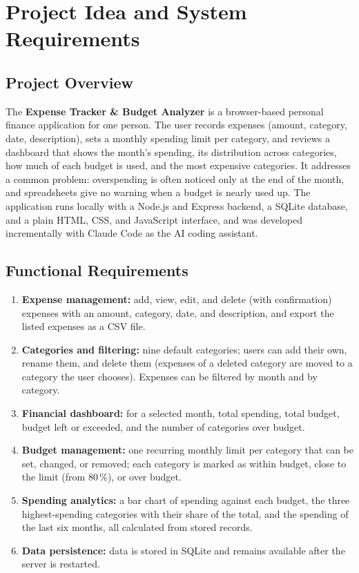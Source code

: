 \documentclass[11pt,a4paper]{article}
\begin{document}
\section{Project Idea and System Requirements}

\subsection{Project Overview}

The \textbf{Expense Tracker \& Budget Analyzer} is a browser-based
personal finance application for one person. The user records expenses
(amount, category, date, description), sets a monthly spending limit per
category, and reviews a dashboard that shows the month's spending, its
distribution across categories, how much of each budget is used, and the
most expensive categories. It addresses a common problem: overspending
is often noticed only at the end of the month, and spreadsheets give no
warning when a budget is nearly used up. The application runs locally
with a Node.js and Express backend, a SQLite database, and a plain HTML,
CSS, and JavaScript interface, and was developed incrementally with
Claude Code as the AI coding assistant.

\subsection{Functional Requirements}

\begin{enumerate}
    \item \textbf{Expense management:} add, view, edit, and delete
    (with confirmation) expenses with an amount, category, date, and
    description, and export the listed expenses as a CSV file.
    \item \textbf{Categories and filtering:} nine default categories;
    users can add their own, rename them, and delete them (expenses of a
    deleted category are moved to a category the user chooses).
    Expenses can be filtered by month and by category.
    \item \textbf{Financial dashboard:} for a selected month, total
    spending, total budget, budget left or exceeded, and the number of
    categories over budget.
    \item \textbf{Budget management:} one recurring monthly limit per
    category that can be set, changed, or removed; each category is
    marked as within budget, close to the limit (from 80\,\%), or over
    budget.
    \item \textbf{Spending analytics:} a bar chart of spending against
    each budget, the three highest-spending categories with their share
    of the total, and the spending of the last six months, all
    calculated from stored records.
    \item \textbf{Data persistence:} data is stored in SQLite and
    remains available after the server is restarted.
\end{enumerate}
\end{document}
